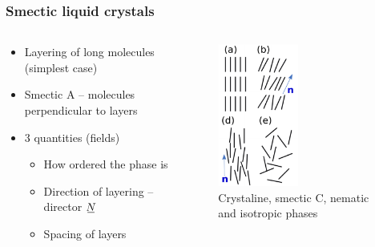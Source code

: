 \documentclass[10pt,mathserif]{beamer}
\begin{document}
\begin{frame}
    \frametitle{Smectic liquid crystals}
    \begin{columns}
        \begin{column}{0.49\textwidth}
            \begin{itemize}
                \item Layering of long molecules \color{gray} (simplest case) \normalcolor
                \item Smectic A -- molecules perpendicular to layers
                \item 3 quantities \color{gray} (fields) \normalcolor
                    \begin{itemize}
                        \item How ordered the phase is
                        \item Direction of layering -- director $\su{N}$
                        \item Spacing of layers
                    \end{itemize}
            \end{itemize}
        \end{column}
        \begin{column}{0.49\textwidth}
            \begin{figure}
                \centering
                \includegraphics[width=0.5\textwidth]{figures/phases.pdf}
                \caption{Crystaline, smectic C, nematic and isotropic phases}
            \end{figure}
        \end{column}
    \end{columns}
\end{frame}
\end{document}
